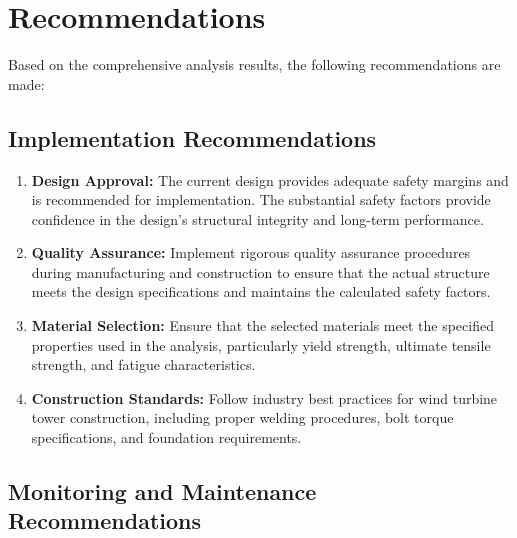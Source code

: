 \documentclass[12pt]{article}
\begin{document}
\section{Recommendations}

Based on the comprehensive analysis results, the following recommendations are made:

\subsection{Implementation Recommendations}

\begin{enumerate}
    \item \textbf{Design Approval:} The current design provides adequate safety margins and is recommended for implementation. The substantial safety factors provide confidence in the design's structural integrity and long-term performance.
    
    \item \textbf{Quality Assurance:} Implement rigorous quality assurance procedures during manufacturing and construction to ensure that the actual structure meets the design specifications and maintains the calculated safety factors.
    
    \item \textbf{Material Selection:} Ensure that the selected materials meet the specified properties used in the analysis, particularly yield strength, ultimate tensile strength, and fatigue characteristics.
    
    \item \textbf{Construction Standards:} Follow industry best practices for wind turbine tower construction, including proper welding procedures, bolt torque specifications, and foundation requirements.
\end{enumerate}

\subsection{Monitoring and Maintenance Recommendations}
\end{document}
